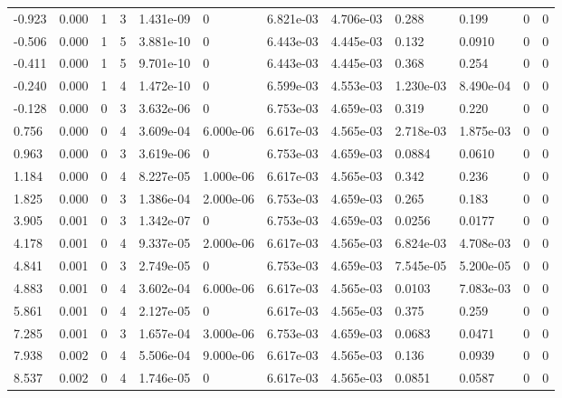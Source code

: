 \documentclass[preview]{standalone}
\begin{document}
{{\begin{tabular}{L{1.2cm}C{1.2cm} C{0.3cm}C{0.5cm} C{1.4cm}C{1.4cm} C{1.4cm}C{1.4cm} C{1.6cm}C{1.6cm} C{1.6cm}C{1.6cm}}
  -0.923  &  0.000  & 1     &  3 &  1.431e-09  & 0  &  6.821e-03&   4.706e-03& 0.288 & 0.199   &  0 & 0  \\ 
  -0.506  &  0.000  & 1     &  5 &  3.881e-10  & 0  &  6.443e-03&   4.445e-03& 0.132 & 0.0910   &  0 & 0  \\ 
  -0.411  &  0.000  & 1     &  5 &  9.701e-10  & 0  &  6.443e-03&   4.445e-03& 0.368 & 0.254   &  0 & 0  \\ 
  -0.240  &  0.000  & 1     &  4 &  1.472e-10  & 0  &  6.599e-03&   4.553e-03& 1.230e-03 & 8.490e-04   &  0 & 0  \\ 
  -0.128  &  0.000  & 0     &  3 &  3.632e-06  & 0  &  6.753e-03&   4.659e-03& 0.319 & 0.220   &  0 & 0  \\ 
  0.756  &  0.000  & 0     &  4 &  3.609e-04  & 6.000e-06  &  6.617e-03&   4.565e-03& 2.718e-03 & 1.875e-03   &  0 & 0  \\ 
  0.963  &  0.000  & 0     &  3 &  3.619e-06  & 0  &  6.753e-03&   4.659e-03& 0.0884 & 0.0610   &  0 & 0  \\ 
  1.184  &  0.000  & 0     &  4 &  8.227e-05  & 1.000e-06  &  6.617e-03&   4.565e-03& 0.342 & 0.236   &  0 & 0  \\ 
  1.825  &  0.000  & 0     &  3 &  1.386e-04  & 2.000e-06  &  6.753e-03&   4.659e-03& 0.265 & 0.183   &  0 & 0  \\ 
  3.905  &  0.001  & 0     &  3 &  1.342e-07  & 0  &  6.753e-03&   4.659e-03& 0.0256 & 0.0177   &  0 & 0  \\ 
  4.178  &  0.001  & 0     &  4 &  9.337e-05  & 2.000e-06  &  6.617e-03&   4.565e-03& 6.824e-03 & 4.708e-03   &  0 & 0  \\ 
  4.841  &  0.001  & 0     &  3 &  2.749e-05  & 0  &  6.753e-03&   4.659e-03& 7.545e-05 & 5.200e-05   &  0 & 0  \\ 
  4.883  &  0.001  & 0     &  4 &  3.602e-04  & 6.000e-06  &  6.617e-03&   4.565e-03& 0.0103 & 7.083e-03   &  0 & 0  \\ 
  5.861  &  0.001  & 0     &  4 &  2.127e-05  & 0  &  6.617e-03&   4.565e-03& 0.375 & 0.259   &  0 & 0  \\ 
  7.285  &  0.001  & 0     &  3 &  1.657e-04  & 3.000e-06  &  6.753e-03&   4.659e-03& 0.0683 & 0.0471   &  0 & 0  \\ 
  7.938  &  0.002  & 0     &  4 &  5.506e-04  & 9.000e-06  &  6.617e-03&   4.565e-03& 0.136 & 0.0939   &  0 & 0  \\ 
  8.537  &  0.002  & 0     &  4 &  1.746e-05  & 0  &  6.617e-03&   4.565e-03& 0.0851 & 0.0587   &  0 & 0  \\ 

\end{tabular}}}
\end{document}
